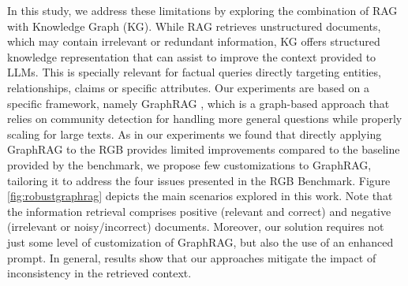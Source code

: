\documentclass[letterpaper, 10 pt, conference]{ieeeconf}  %
\begin{document}




In this study, we address these limitations by exploring the combination of RAG with Knowledge Graph (KG). While RAG retrieves unstructured documents, which may contain irrelevant or redundant information, KG offers structured knowledge representation that can assist to improve the context provided to LLMs. This is specially relevant for factual queries directly targeting entities, relationships, claims or specific attributes. Our experiments are based on a specific framework, namely GraphRAG \cite{edge2024}, which is a graph-based approach that relies on community detection for handling more general questions while properly scaling for large texts. As in our experiments we found that directly applying GraphRAG to the RGB provides limited improvements compared to the baseline provided by the benchmark, we propose few customizations to GraphRAG, tailoring it to address the four issues presented in the RGB Benchmark. Figure \ref{fig:robustgraphrag} depicts the main scenarios explored in this work. Note that the information retrieval comprises positive (relevant and correct) and negative (irrelevant or noisy/incorrect) documents. Moreover, our solution requires not just some level of customization of GraphRAG, but also the use of an enhanced prompt. In general, results show that our approaches mitigate the impact of inconsistency in the retrieved context.
\end{document}
